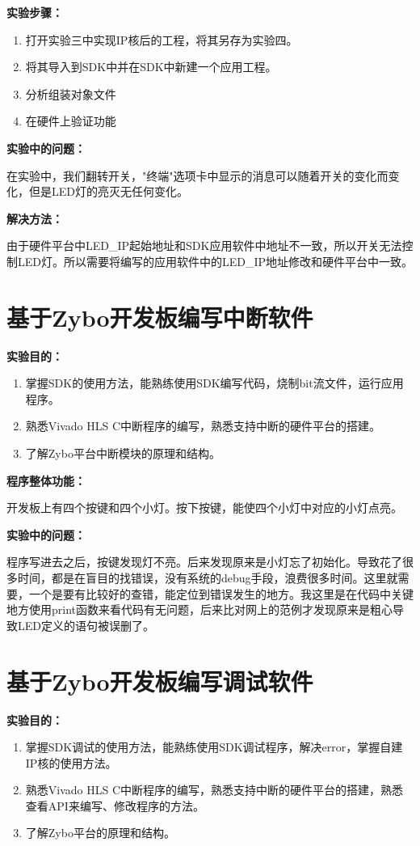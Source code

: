 \documentclass{itecreport-zh}
\begin{document}
\textbf{实验步骤：}
\begin{enumerate}
  \item 打开实验三中实现IP核后的工程，将其另存为实验四。
  \item 将其导入到SDK中并在SDK中新建一个应用工程。
  \item 分析组装对象文件
  \item 在硬件上验证功能
\end{enumerate}

\textbf{实验中的问题：}


在实验中，我们翻转开关，"终端"选项卡中显示的消息可以随着开关的变化而变化，但是LED灯的亮灭无任何变化。


\textbf{解决方法：}


由于硬件平台中LED\_IP起始地址和SDK应用软件中地址不一致，所以开关无法控制LED灯。所以需要将编写的应用软件中的LED\_IP地址修改和硬件平台中一致。

\section{基于Zybo开发板编写中断软件}

\textbf{实验目的：}
\begin{enumerate}
  \item 掌握SDK的使用方法，能熟练使用SDK编写代码，烧制bit流文件，运行应用程序。
  \item 熟悉Vivado HLS C中断程序的编写，熟悉支持中断的硬件平台的搭建。
  \item 了解Zybo平台中断模块的原理和结构。
\end{enumerate}

\textbf{程序整体功能：}


开发板上有四个按键和四个小灯。按下按键，能使四个小灯中对应的小灯点亮。


\textbf{实验中的问题：}


程序写进去之后，按键发现灯不亮。后来发现原来是小灯忘了初始化。导致花了很多时间，都是在盲目的找错误，没有系统的debug手段，浪费很多时间。这里就需要，一个是要有比较好的查错，能定位到错误发生的地方。我这里是在代码中关键地方使用print函数来看代码有无问题，后来比对网上的范例才发现原来是粗心导致LED定义的语句被误删了。

\section{基于Zybo开发板编写调试软件}

\textbf{实验目的：}
\begin{enumerate}
  \item 掌握SDK调试的使用方法，能熟练使用SDK调试程序，解决error，掌握自建IP核的使用方法。
  \item 熟悉Vivado HLS C中断程序的编写，熟悉支持中断的硬件平台的搭建，熟悉查看API来编写、修改程序的方法。
  \item 了解Zybo平台的原理和结构。
\end{enumerate}
\end{document}
